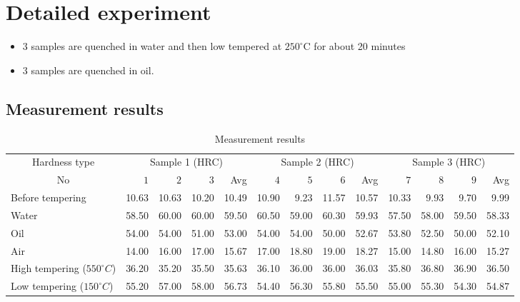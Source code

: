 \section{Detailed experiment}
\begin{itemize}
	\item 3 samples are quenched in water and then low tempered at $ 250^\circ $C for about 20 minutes
	\item 3 samples are quenched in oil.
\end{itemize}

\begin{landscape}
\section{Measurement results}
	\vspace*{\fill}
	\renewcommand{\arraystretch}{1.5}
	\begin{table}[ht]
		\begin{tabular}[ht]{lrrrrrrrrrrrr}
			\toprule
			\multicolumn{1}{c}{Hardness type} & \multicolumn{4}{c}{Sample 1 (HRC)}  & \multicolumn{4}{c}{Sample 2 (HRC)}  & \multicolumn{4}{c}{Sample 3 (HRC)}\\
			\cmidrule{2-5}\cmidrule{6-9}\cmidrule{10-13} \multicolumn{1}{c}{No} & $ 1 $ & $ 2 $ & $ 3 $ & Avg & $ 4 $ & $ 5 $ & $ 6 $ & Avg & $ 7 $ & $ 8 $ & $ 9 $ & Avg\\\midrule
			\rowcolor{lightgray!20}{\cellcolor[HTML]{C0C0C0}}Before tempering &10.63&10.63&10.20 & 10.49 & 10.90&9.23&11.57&10.57&10.33  &9.93&9.70&9.99\\
			{\cellcolor[HTML]{C0C0C0}}Water &58.50&60.00&60.00&59.50&60.50&59.00&60.30&59.93&57.50&58.00&59.50&58.33\\
			\rowcolor{lightgray!20}{\cellcolor[HTML]{C0C0C0}}Oil &54.00&54.00&51.00&53.00&54.00&54.00&50.00&52.67&53.80&52.50&50.00&52.10\\		{\cellcolor[HTML]{C0C0C0}}Air &14.00&16.00&17.00&15.67&17.00&18.80&19.00&18.27&15.00&14.80&16.00&15.27\\		\rowcolor{lightgray!20}{\cellcolor[HTML]{C0C0C0}}High tempering ($ 550^\circ C $) &36.20&35.20&35.50&35.63&36.10&36.00&36.00&36.03&35.80&36.80&36.90&36.50\\		{\cellcolor[HTML]{C0C0C0}}Low tempering ($ 150^\circ C $) &55.20&57.00&58.00&56.73&54.40&56.30&55.80&55.50&55.00&55.30&54.30&54.87\\\bottomrule
		\end{tabular}
		\caption{Measurement results}
	\end{table}
	
	\vspace*{\fill}
\end{landscape}

